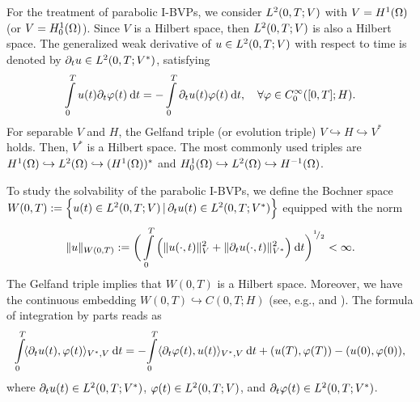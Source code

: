 For the treatment of parabolic I-BVPs, we consider $L^{2} (0, T; V)$ with \linebreak
$V = H^{1}(\Omega)$ (or $V = H_0^{1}(\Omega)$). Since $V$ is a 
Hilbert space, then $L^{2} (0, T; V)$ is also a Hilbert space. 
The generalized weak derivative of  $u \in L^{2} (0, T; V)$ with respect to time is 
denoted by $\partial_t u \in L^{2} (0, T; V^*)$, satisfying  
%
\begin{equation*}
\Int_0^T u(t) \partial_t \varphi (t) \dt 
= -\Int_0^T \partial_t u(t) \varphi (t) \dt, \quad \forall
\varphi \in C^{\infty}_0 ([0, T]; H).
\end{equation*}
%
For separable $V$ and $H$, the Gelfand triple (or evolution triple) \linebreak
$V \hookrightarrow H \hookrightarrow V^*$ holds. Then, 
$V^*$ is a Hilbert space. The most commonly used triples are  
$H^{1}(\Omega) \hookrightarrow L^{2}(\Omega) \hookrightarrow (H^{1}(\Omega))^*$ and 
$H^{1}_{0}(\Omega) \hookrightarrow L^{2}(\Omega) \hookrightarrow H^{-1}(\Omega)$.

To study the solvability of the parabolic I-BVPs, we define the Bochner space 
%
$W(0, T) := \Big\{u(t) \in L^{2} (0, T; V) \, | \,
         \partial_t u(t) \in L^{2} (0, T; V^*) \Big\}$
%
equipped with the norm
%
\begin{equation*}
\|u\|_{W(0, T)} 
:= \bigg(\Int_0^T \Big( \| u(\cdot, t)\|^2_{V} 
                         + \| \partial_t u(\cdot, t)\|^2_{V^*} 
									\Big) \dt \bigg)^{\rfrac{1}{2}} < \infty.
\end{equation*}
%
The Gelfand triple implies that $W(0, T)$ is a Hilbert space. 
Moreover, we have the continuous embedding $W(0, T) \hookrightarrow C(0, T; H)$ 
(see, e.g., \cite{Wloka1987} and \cite{Zeidler1990A}).
The formula of integration by parts reads as 
%
\begin{equation*}
\Int_0^T \! \langle \partial_t u(t),  \varphi (t) \rangle_{V^*, V} \dt 
= - \! \Int_0^T \langle \partial_t \varphi (t), u(t) \rangle_{V^*, V} \dt 
+ (u(T),  \varphi (T)) - (u(0),  \varphi (0)),
\end{equation*}
%
where 
$\partial_t u(t) \in L^{2} (0, T; V^*)$, 
$\varphi(t) \in L^{2} (0, T; V)$, and 
$\partial_t \varphi(t) \in L^{2} (0, T; V^*)$.
%


